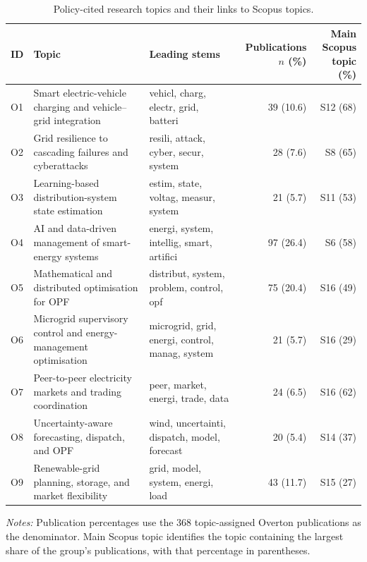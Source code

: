 \documentclass[a4paper,fleqn]{cas-sc}
\begin{document}
\begin{table}[htbp]
\centering
\caption{Policy-cited research topics and their links to Scopus topics.}
\label{tab:opf_policy_topics}
\scriptsize
\setlength{\tabcolsep}{3pt}
\renewcommand{\arraystretch}{1.10}
\begin{tabularx}{\textwidth}{
l
>{\raggedright\arraybackslash}X
>{\raggedright\arraybackslash}X
rr}
\toprule
ID & Topic & Leading stems
& \shortstack{Publications\\$n$ (\%)}
& \shortstack{Main Scopus\\topic (\%)} \\
\midrule

O1 & Smart electric-vehicle charging and vehicle--grid integration
& vehicl, charg, electr, grid, batteri
& 39 (10.6) & S12 (68) \\

O2 & Grid resilience to cascading failures and cyberattacks
& resili, attack, cyber, secur, system
& 28 (7.6) & S8 (65) \\

O3 & Learning-based distribution-system state estimation
& estim, state, voltag, measur, system
& 21 (5.7) & S11 (53) \\

O4 & AI and data-driven management of smart-energy systems
& energi, system, intellig, smart, artifici
& 97 (26.4) & S6 (58) \\

O5 & Mathematical and distributed optimisation for OPF
& distribut, system, problem, control, opf
& 75 (20.4) & S16 (49) \\

O6 & Microgrid supervisory control and energy-management optimisation
& microgrid, grid, energi, control, manag, system
& 21 (5.7) & S16 (29) \\

O7 & Peer-to-peer electricity markets and trading coordination
& peer, market, energi, trade, data
& 24 (6.5) & S16 (62) \\

O8 & Uncertainty-aware forecasting, dispatch, and OPF
& wind, uncertainti, dispatch, model, forecast
& 20 (5.4) & S14 (37) \\

O9 & Renewable-grid planning, storage, and market flexibility
& grid, model, system, energi, load
& 43 (11.7) & S15 (27) \\

\bottomrule
\end{tabularx}
\par\smallskip
\begin{minipage}{\textwidth}
\footnotesize
\textit{Notes:} Publication percentages use the 368 topic-assigned Overton publications as the denominator. Main Scopus topic identifies the topic containing the largest share of the group's publications, with that percentage in parentheses.
\end{minipage}
\end{table}
\end{document}
